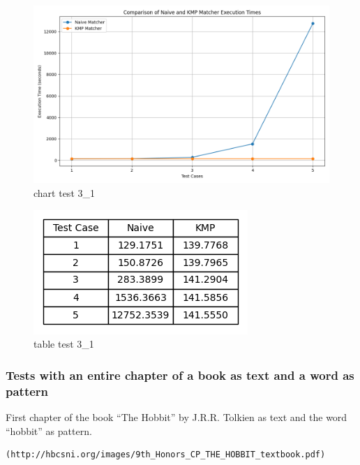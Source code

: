 \documentclass[11pt]{article}
\begin{document}
                \begin{figure}[H]
                    \centering
                    \includegraphics[width = \textwidth]{execution_times_3_1}
                    \caption{chart test 3\_1}
                    \label{fig:chart_test_3_1}
                \end{figure}

                \begin{figure}[H]
                    \centering
                    \includegraphics[width = 0.5 \textwidth]{table_execution_times_3_1}
                    \caption{table test 3\_1}
                    \label{fig:table_test_3_1}
                \end{figure}

            \newpage


            \subsubsection{Tests with an entire chapter of a book as text and a word as pattern} \label{subsubsec:tests_4}


                First chapter of the book ``The Hobbit'' by J.R.R. Tolkien as text and the word ``hobbit'' as pattern.
                \begin{verbatim}(http://hbcsni.org/images/9th_Honors_CP_THE_HOBBIT_textbook.pdf)\end{verbatim}
\end{document}

